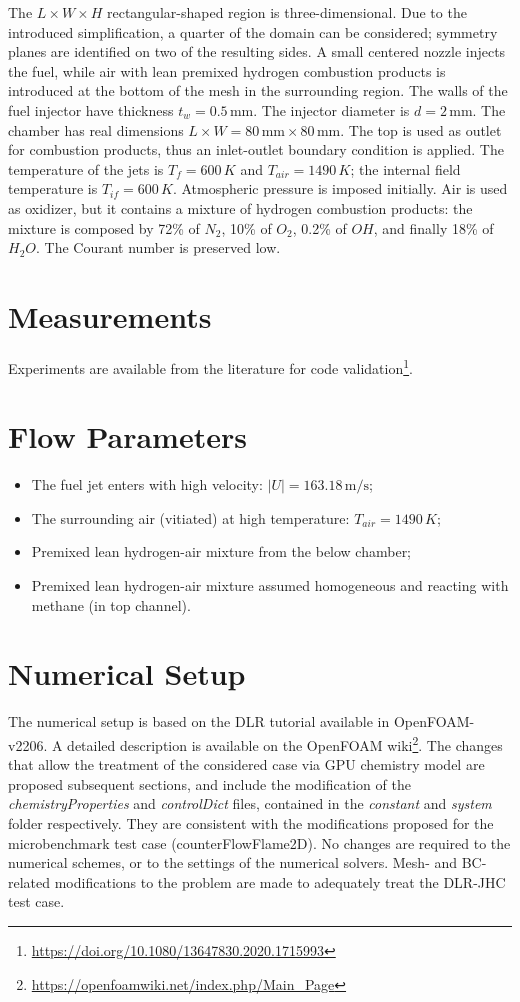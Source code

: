 The $L \times W \times H$ rectangular-shaped region is three-dimensional. Due to the introduced simplification, a quarter of the domain can be considered; symmetry planes are identified on two of the resulting sides. A small centered nozzle injects the fuel, while air with lean premixed hydrogen combustion products is introduced at the bottom of the mesh in the surrounding region. The walls of the fuel injector have thickness $t_w = 0.5 \, \text{mm}$. The injector diameter is $d = 2 \, \text{mm}$. The chamber has real dimensions $L \times W = 80 \, \text{mm} \times 80 \, \text{mm}$. The top is used as outlet for combustion products, thus an inlet-outlet boundary condition is applied. The temperature of the jets is $T_f = 600 \, K$ and $T_{air} = 1490 \, K$; the internal field temperature is $T_{if} = 600 \, K$. Atmospheric pressure is imposed initially. Air is used as oxidizer, but it contains a mixture of hydrogen combustion products: the mixture is composed by 72\% of $N_2$, 10\% of $O_2$, 0.2\% of $OH$, and finally 18\% of $H_2O$. The Courant number is preserved low.

\section*{Measurements}
Experiments are available from the literature for code validation\footnote{\url{https://doi.org/10.1080/13647830.2020.1715993}}.

\section*{Flow Parameters}
\begin{itemize}
    \item The fuel jet enters with high velocity: $\left| U \right| = 163.18 \, \text{m/s}$;
    \item The surrounding air (vitiated) at high temperature: $T_{air} = 1490 \, K$;
    \item Premixed lean hydrogen-air mixture from the below chamber;
    \item Premixed lean hydrogen-air mixture assumed homogeneous and reacting with methane (in top channel).
\end{itemize}

\section*{Numerical Setup}
The numerical setup is based on the DLR tutorial available in OpenFOAM-v2206. A detailed description is available on the OpenFOAM wiki\footnote{\url{https://openfoamwiki.net/index.php/Main_Page}}. The changes that allow the treatment of the considered case via GPU chemistry model are proposed subsequent sections, and include the modification of the \textit{chemistryProperties} and \textit{controlDict} files, contained in the \textit{constant} and \textit{system} folder respectively. They are consistent with the modifications proposed for the microbenchmark test case (counterFlowFlame2D). No changes are required to the numerical schemes, or to the settings of the numerical solvers. Mesh- and BC-related modifications to the problem are made to adequately treat the DLR-JHC test case.

